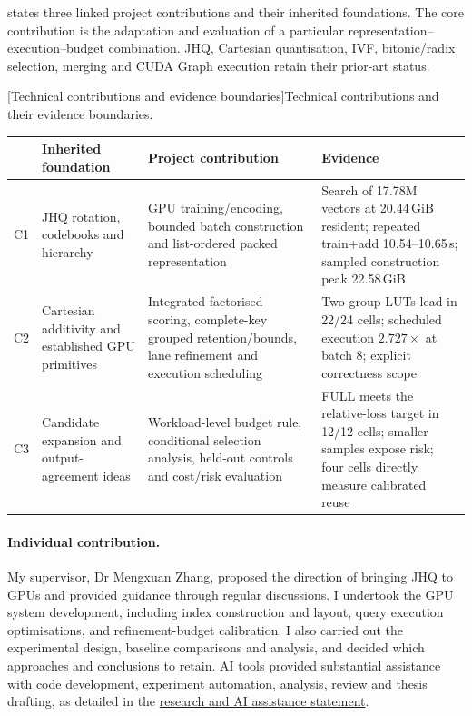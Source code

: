  states three linked project contributions and
their inherited foundations. The core contribution is the adaptation and
evaluation of a particular representation--execution--budget combination.
JHQ, Cartesian quantisation, IVF, bitonic/radix selection, merging and CUDA
Graph execution retain their prior-art status.

\par\noindent\begin{minipage}{\linewidth}
\setlength{\parindent}{1.2em}
\par\medskip\noindent\begin{minipage}{\linewidth}
\centering\captionsetup{hypcap=false}
[Technical contributions and evidence boundaries]{Technical contributions and their evidence boundaries.}
\label{tab:1-contributions}
\footnotesize\setlength{\tabcolsep}{3pt}
\begin{tabularx}{\linewidth}{@{}l>{\raggedright\arraybackslash}p{.23\linewidth}*{2}{>{\raggedright\arraybackslash}X}@{}}
\toprule
 & Inherited foundation & Project contribution & Evidence \\
\midrule
C1 & JHQ rotation, codebooks and hierarchy & GPU training/encoding,
bounded batch construction and list-ordered packed representation
& Search of 17.78M vectors at 20.44\,GiB resident; repeated train+add
10.54--10.65\,s; sampled construction peak 22.58\,GiB \\
C2 & Cartesian additivity and established GPU primitives & Integrated
factorised scoring, complete-key grouped retention/bounds, lane refinement
and execution scheduling & Two-group LUTs lead in 22/24 cells;
scheduled execution $2.727\times$ at batch 8; explicit correctness scope \\
C3 & Candidate expansion and output-agreement ideas & Workload-level
budget rule, conditional selection analysis, held-out controls and cost/risk
evaluation & FULL meets the relative-loss target in 12/12 cells;
smaller samples expose risk; four cells directly measure calibrated reuse \\
\bottomrule
\end{tabularx}
\end{minipage}\par\medskip

\paragraph*{Individual contribution.}
My supervisor, Dr Mengxuan Zhang, proposed the direction of bringing JHQ
to GPUs and provided guidance through regular discussions. I undertook
the GPU system development, including index construction and layout,
query execution optimisations, and refinement-budget calibration. I also
carried out the experimental design, baseline comparisons and analysis,
and decided which approaches and conclusions to retain. AI tools
provided substantial assistance with code development, experiment
automation, analysis, review and thesis drafting, as detailed in the
\hyperref[front:provenance]{research and AI assistance statement}.

\end{minipage}\par
